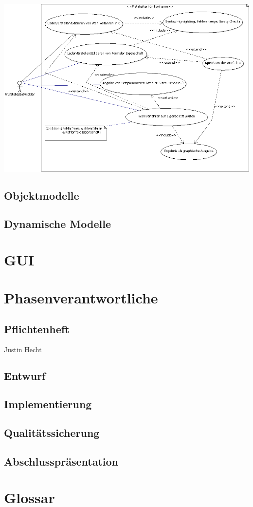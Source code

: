 \documentclass[a4paper]{scrreprt}
\begin{document}
{\vspace{0.5cm}\hspace*{-3cm}\includegraphics[scale=0.49]{Use-Case-Diagram}}
	
 
\section{Objektmodelle}
\section{Dynamische Modelle}


\chapter{GUI}


\chapter{Phasenverantwortliche}
\section{Pflichtenheft} Justin Hecht
\section{Entwurf} 
\section{Implementierung}
\section{Qualitätssicherung} 
\section{Abschlusspräsentation} 


\chapter{Glossar}
 

 

\listoffigures
 
\end{document}
